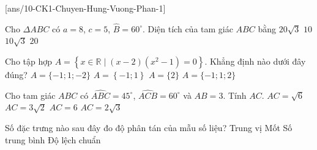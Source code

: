 \caulc
{}[ans/10-CK1-Chuyen-Hung-Vuong-Phan-1]
\begin{ex}%
	Cho $\mathit{\Delta}ABC$ có $a=8$, $c=5$, $\widehat{B}=60^\circ $. Diện tích của tam giác $ABC$ bằng
	\choice
	{$20\sqrt{3}$}
	{$10$}
	{\True $10\sqrt{3}$}
	{$20$}
\end{ex}
\begin{ex}%
	 Cho tập hợp $A=\left\{x\in \mathbb{R}\mid(x-2)\left(x^2-1\right)=0\right\}$. Khẳng định nào dưới đây đúng? 
	\choice
	{$A=\{-1;1;-2\}$}
	{$A=\left\{-1;1\right\}$}
	{$A=\{2\}$}
	{\True $A=\{-1;1;2\}$}
\end{ex}
\begin{ex}%
	Cho tam giác $ABC$ có $\widehat{ABC}=45^\circ$, $\widehat{ACB}=60^\circ$ và $AB=3$. Tính $AC$.
	\choice
	{\True $AC=\sqrt{6}$}
	{$AC=3\sqrt{2}$}
	{$AC=6$}
	{$AC=2\sqrt{3}$}
\end{ex}
\begin{ex}%
	Số đặc trưng nào sau đây đo độ phân tán của mẫu số liệu?
	\choice
	{Trung vị}
	{Mốt}
	{Số trung bình}
	{\True Độ lệch chuẩn}
\end{ex}
